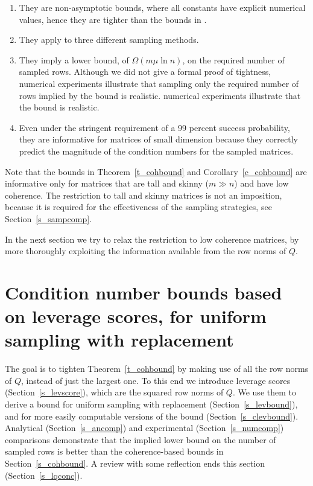 \documentclass{siamltex}
\begin{document}
\begin{enumerate}
\item They are non-asymptotic bounds, where all constants have explicit
numerical values, hence they are tighter than 
the bounds in \cite[Theorem 3.2]{AMTol10}.

\item They apply to three different sampling methods.
\item They imply a lower bound, of $\Omega\left(m\mu\ln{n}\right)$,
on the required number of sampled rows. Although we did not give a formal
proof of tightness, 
numerical experiments illustrate that sampling only the required number
of rows implied by the bound is realistic.
numerical experiments illustrate that the bound is realistic.

\item Even under the stringent requirement of a 99 percent success 
probability, 
they are informative for matrices of small dimension because they
correctly predict the magnitude of the condition
numbers for the sampled matrices.
\end{enumerate}

Note that the bounds in Theorem~\ref{t_cohbound} and
Corollary~\ref{c_cohbound} are informative only for matrices that are
tall and skinny ($m\gg n$) and have low coherence. 
The restriction to tall and skinny matrices is not an imposition,
because it is required for 
the effectiveness of the sampling strategies, see Section~\ref{s_sampcomp}.

In the next section we try to relax the restriction to low coherence
matrices, by more thoroughly exploiting the information available from
the row norms of $Q$.

 

\section{Condition number bounds based on leverage scores, for uniform sampling 
with replacement}\label{s_leverage} 

The goal is to tighten Theorem~\ref{t_cohbound} by making use of all
the row norms of $Q$, instead of just the largest one.
To this end we introduce leverage scores
(Section~\ref{s_levscore}), which are the squared row norms of $Q$.
We use them to derive a bound for uniform sampling with
replacement (Section~\ref{s_levbound}), and for
more easily computable versions of the bound (Section~\ref{s_clevbound}).
Analytical
(Section~\ref{s_ancomp}) and experimental (Section~\ref{s_numcomp})
comparisons demonstrate that the implied lower bound on the number of
sampled rows is better than the coherence-based bounds in
Section~\ref{s_cohbound}. A review with some reflection ends this
section (Section~\ref{s_lqconc}).
\end{document}
